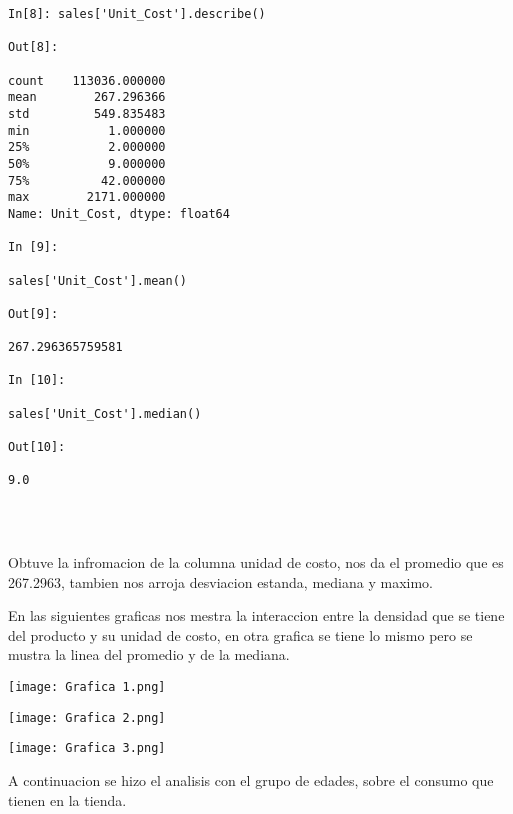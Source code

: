 \documentclass[
	12pt, %
]{fphw}
\begin{document}
\lstset{language=Python}
\lstset{frame=lines}
\lstset{basicstyle=\footnotesize}
\begin{lstlisting}
In[8]: sales['Unit_Cost'].describe()

Out[8]:

count    113036.000000
mean        267.296366
std         549.835483
min           1.000000
25%           2.000000
50%           9.000000
75%          42.000000
max        2171.000000
Name: Unit_Cost, dtype: float64

In [9]:

sales['Unit_Cost'].mean()

Out[9]:

267.296365759581

In [10]:

sales['Unit_Cost'].median()

Out[10]:

9.0




\end{lstlisting}

Obtuve la infromacion de la columna unidad de costo, nos da el promedio que es 267.2963, tambien nos arroja desviacion estanda, mediana y maximo.

En las siguientes graficas nos mestra la interaccion entre la densidad que se tiene del producto y su unidad de costo, en otra grafica se tiene lo mismo pero se mustra la linea del promedio y de la mediana.
\begin{center}
	\texttt{[image: Grafica 1.png]} %
\end{center}

\begin{center}
	\texttt{[image: Grafica 2.png]} %
\end{center}

\begin{center}
	\texttt{[image: Grafica 3.png]} %
\end{center}

A continuacion se hizo el analisis con el grupo de edades, sobre el consumo que tienen en la tienda.
\end{document}
